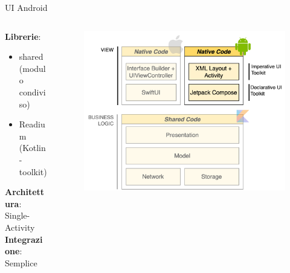 \begin{frame}{UI Android}
    \begin{columns}[onlytextwidth]
        \begin{column}{0.4\textwidth}
            \textbf{Librerie}:
            \begin{itemize}
                \item shared (modulo condiviso)
                \item Readium (Kotlin-toolkit)
            \end{itemize}
            \vspace{2mm}
            \textbf{Architettura}: Single-Activity\\
            \vspace{3mm}
            \textbf{Integrazione}: Semplice
        \end{column}
        \begin{column}{0.6\textwidth}
             \begin{figure}[H]
                \includegraphics[width=1\textwidth]{img/stack_kmm_android.png}
            \end{figure}
        \end{column}
    \end{columns}
\end{frame}

